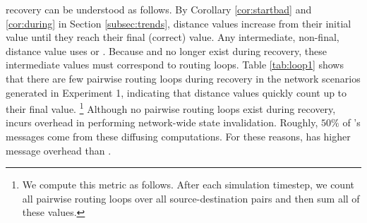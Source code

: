 \begin{figure*}[t]
\centering
{}
\caption{Experiment 1: time overhead for \er Graphs with Fixed Unit Link Weights generated over different $p$ values.}
\label{fig:epoch}
\end{figure*} 



\second recovery can be understood as follows.  By Corollary \ref{cor:startbad} and \ref{cor:during} in Section \ref{subsec:trends}, distance values increase from their initial value until they 
reach their final (correct) value. Any intermediate, non-final, distance value uses \badvector or \oldvectors. Because \badvector and \oldvector no longer exist during recovery,
these intermediate values must correspond to routing loops.
Table \ref{tab:loop1} shows that there are few pairwise routing loops during \second recovery in the network scenarios generated in Experiment 1, 
indicating that \second distance values quickly count up to their final value.
{\footnote {\small We compute this metric as follows. After each simulation timestep, we count all pairwise routing loops over all source-destination pairs and then sum all of these values.}}
Although no pairwise routing loops exist during \purge recovery, \purge incurs overhead in performing network-wide state invalidation. Roughly, $50\%$ of \purges's messages come from these
diffusing computations. 
For these reasons, \purge has higher message overhead than \seconds.

